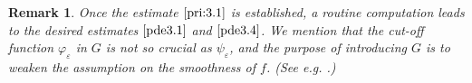 \documentclass[13pt,CJK]{article}
\theoremstyle{plain}                       %
\newtheorem{remark}[lemma]{Remark}
\theoremstyle{remark}
\numberwithin{equation}{section}
\begin{document}
\begin{remark}
\emph{Once the estimate $\eqref{pri:3.1}$ is established,
a routine computation leads to the desired estimates $\eqref{pde3.1}$
and $\eqref{pde3.4}$. We mention that the cut-off function $\varphi_\varepsilon$ in $G$ is not so crucial as
$\psi_\varepsilon$, and the purpose of introducing $G$ is to weaken the assumption on the smoothness of $f$. (See e.g. \cite{Shen18,Xu16}.)}
\end{remark}
\end{document}
